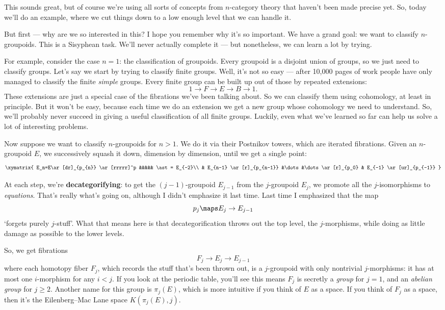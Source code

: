 \documentclass[12pt]{amsart}
\begin{document}
This sounds great, but of course we're using all sorts of concepts
from $n$-category theory that haven't been made precise yet.  So, 
today we'll do an example, where we cut things down to a low enough 
level that we can handle it.

But first --- why are we so interested in this?  I hope you remember
why it's so important.  We have a grand goal: we want to classify
$n$-groupoids.   This is a Sisyphean task.  We'll never
actually complete it --- but nonetheless, we can learn a lot by trying.

For example, consider the case $n = 1$: the classification of groupoids.  
Every groupoid is a disjoint union of groups, so we just need to 
classify groups.  Let's say we start by trying to classify finite
groups.  Well, it's not so easy --- after 10,000 pages of work people
have only managed to classify the finite \emph{simple} groups.
Every finite group can be built up out of those by repeated extensions:
\[ 1\to F\to E\to B \to 1.  \]
These extensions are just a special case of the fibrations we've been talking
about.   So we can classify them using cohomology, at least in principle.  
But it won't be easy, because each time we do an extension we get a 
new group whose cohomology we need to understand.  So, we'll
probably never succeed in giving a useful classification of all
finite groups.  Luckily, even what we've learned so far can help us 
solve a lot of interesting problems. 

Now suppose we want to classify $n$-groupoids for $n > 1$.  
We do it via their Postnikov towers, which are iterated 
fibrations.  Given an $n$-groupoid $E$, we successively 
squash it down, dimension by dimension, until we get a single point: 
\[\xymatrix{
  E_n=E\ar[dr]_{p_{n}} \ar[rrrrr]^p &&&&& \ast = E_{-2}\\
  & E_{n-1} \ar[r]_{p_{n-1}} &\dots&\dots \ar[r]_{p_0} & E_{-1} 
  \ar[ur]_{p_{-1}}
}\]

\noindent
At each step, we're \textbf{decategorifying}: to get the $(j-1)$-groupoid 
$E_{j-1}$ from the $j$-groupoid $E_j$, we promote all the 
$j$-isomorphisms to \emph{equations}.  That's really what's going on, 
although I didn't emphasize it last time.  Last time I emphasized 
that the map 
\[     p_j \maps E_j \to E_{j-1}   \]
`forgets purely $j$-stuff'.  What that means here is that decategorification
throws out the top level, the $j$-morphisms, while doing as little 
damage as possible to the lower levels.  

So, we get fibrations
\[         F_j \to E_j \to E_{j-1}  \]
where each homotopy fiber $F_j$, which records the stuff that's been 
thrown out, is a $j$-groupoid with only nontrivial $j$-morphisms: it 
has at most one $i$-morphism for any $i < j$.  
If you look at the periodic table, you'll see this means $F_j$ is
secretly a \emph{group} for $j = 1$, and an \emph{abelian group} for 
$j \ge 2$.  Another name for this group is $\pi_j(E)$, which is
more intuitive if you think of $E$ as a space.  If you think of 
$F_j$ as a space, then it's the Eilenberg--Mac Lane space 
$K(\pi_j(E), j)$.
\end{document}
